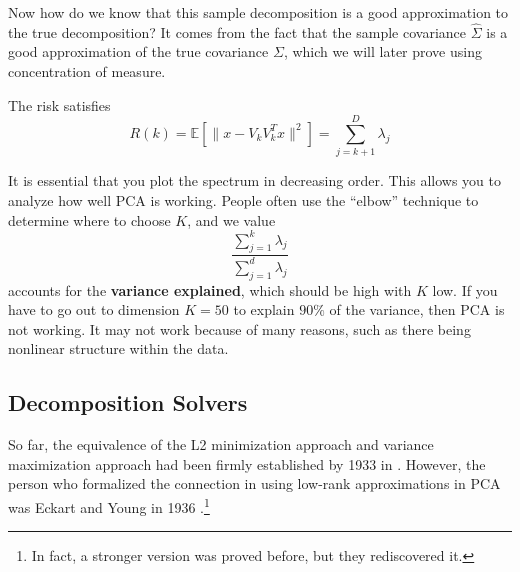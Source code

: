   Now how do we know that this sample decomposition is a good approximation to the true decomposition? It comes from the fact that the sample covariance $\hat{\Sigma}$ is a good approximation of the true covariance $\Sigma$, which we will later prove using concentration of measure. 

  \begin{theorem}[Risk]
    The risk satisfies 
    \begin{equation}
      R(k) = \mathbb{E}[\| x - V_k V_k^T x \|^2 ] = \sum_{j=k+1}^D \lambda_j 
    \end{equation}
  \end{theorem}

  It is essential that you plot the spectrum in decreasing order. This allows you to analyze how well PCA is working. People often use the ``elbow'' technique to determine where to choose $K$, and we value 
  \begin{equation}
    \frac{\sum_{j=1}^k \lambda_j}{\sum_{j=1}^d \lambda_j} 
  \end{equation}
  accounts for the \textbf{variance explained}, which should be high with $K$ low. If you have to go out to dimension $K=50$ to explain $90\%$ of the variance, then PCA is not working. It may not work because of many reasons, such as there being nonlinear structure within the data. 

\subsection{Decomposition Solvers}

  So far, the equivalence of the L2 minimization approach and variance maximization approach had been firmly established by 1933 in \cite{1933hotelling}. However, the person who formalized the connection in using low-rank approximations in PCA was Eckart and Young in 1936 \cite{1936eckart}.\footnote{In fact, a stronger version was proved before, but they rediscovered it.}
  
